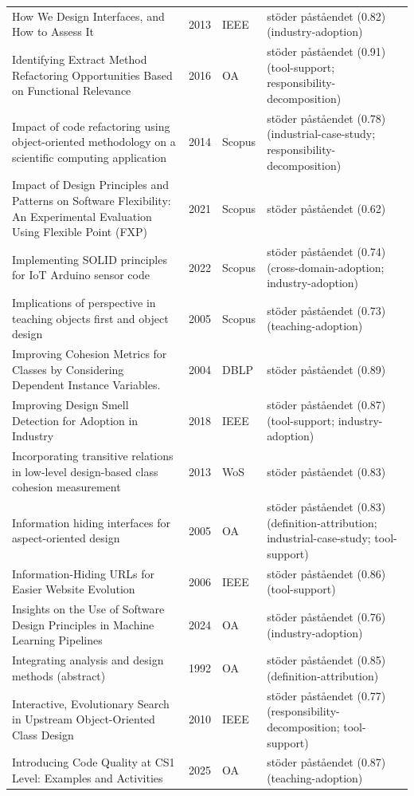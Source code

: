 \begin{longtable}{@{}%
  >{\raggedright\arraybackslash}p{}c%
  >{\raggedright\arraybackslash}p{}%
  >{\raggedright\arraybackslash}p{}@{}}
How We Design Interfaces, and How to Assess It & 2013 & IEEE & stöder påståendet (0.82) (industry-adoption) \\
Identifying Extract Method Refactoring Opportunities Based on Functional Relevance & 2016 & OA & stöder påståendet (0.91) (tool-support; responsibility-decomposition) \\
Impact of code refactoring using object-oriented methodology on a scientific computing application & 2014 & Scopus & stöder påståendet (0.78) (industrial-case-study; responsibility-decomposition) \\
Impact of Design Principles and Patterns on Software Flexibility: An Experimental Evaluation Using Flexible Point (FXP) & 2021 & Scopus & stöder påståendet (0.62) \\
Implementing SOLID principles for IoT Arduino sensor code & 2022 & Scopus & stöder påståendet (0.74) (cross-domain-adoption; industry-adoption) \\
Implications of perspective in teaching objects first and object design & 2005 & Scopus & stöder påståendet (0.73) (teaching-adoption) \\
Improving Cohesion Metrics for Classes by Considering Dependent Instance Variables. & 2004 & DBLP & stöder påståendet (0.89) \\
Improving Design Smell Detection for Adoption in Industry & 2018 & IEEE & stöder påståendet (0.87) (tool-support; industry-adoption) \\
Incorporating transitive relations in low-level design-based class cohesion measurement & 2013 & WoS & stöder påståendet (0.83) \\
Information hiding interfaces for aspect-oriented design & 2005 & OA & stöder påståendet (0.83) (definition-attribution; industrial-case-study; tool-support) \\
Information-Hiding URLs for Easier Website Evolution & 2006 & IEEE & stöder påståendet (0.86) (tool-support) \\
Insights on the Use of Software Design Principles in Machine Learning Pipelines & 2024 & OA & stöder påståendet (0.76) (industry-adoption) \\
Integrating analysis and design methods (abstract) & 1992 & OA & stöder påståendet (0.85) (definition-attribution) \\
Interactive, Evolutionary Search in Upstream Object-Oriented Class Design & 2010 & IEEE & stöder påståendet (0.77) (responsibility-decomposition; tool-support) \\
Introducing Code Quality at CS1 Level: Examples and Activities & 2025 & OA & stöder påståendet (0.87) (teaching-adoption) \\

\end{longtable}
